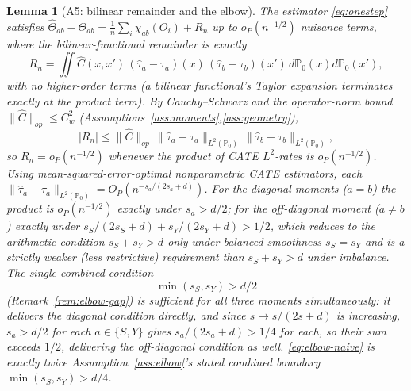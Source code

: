 \documentclass[11pt]{article}
\theoremstyle{plain}
\newtheorem{lemma}[theorem]{Lemma}
\theoremstyle{definition}
\theoremstyle{remark}
\newcommand{\PP}{\mathbb{P}}
\begin{document}
\begin{lemma}[A5: bilinear remainder and the elbow]\label{lem:elbow-remainder}
The estimator \eqref{eq:onestep} satisfies
$\hat\Theta_{ab}-\Theta_{ab}=\frac1n\sum_i\chi_{ab}(O_i)+R_n$ up to $o_P(n^{-1/2})$
nuisance terms, where the bilinear-functional remainder is exactly
\begin{equation}\label{eq:remainder}
    R_n = \iint \hat C(x,x')\,(\hat\tau_a-\tau_a)(x)\,(\hat\tau_b-\tau_b)(x')\,d\PP_0(x)d\PP_0(x'),
\end{equation}
with no higher-order terms (a bilinear functional's Taylor expansion terminates
exactly at the product term). By Cauchy--Schwarz and the operator-norm bound
$\|\hat C\|_{op}\le C_w^2$ (Assumptions~\ref{ass:moments},\ref{ass:geometry}),
\begin{equation}\label{eq:CS-remainder}
    |R_n| \le \|\hat C\|_{op}\,\|\hat\tau_a-\tau_a\|_{L^2(\PP_0)}\,\|\hat\tau_b-\tau_b\|_{L^2(\PP_0)},
\end{equation}
so $R_n=o_P(n^{-1/2})$ whenever the product of CATE $L^2$-rates is $o_P(n^{-1/2})$.
Using mean-squared-error-optimal nonparametric CATE estimators, each
$\|\hat\tau_a-\tau_a\|_{L^2(\PP_0)}=O_P(n^{-s_a/(2s_a+d)})$. For the diagonal moments
($a=b$) the product is $o_P(n^{-1/2})$ exactly under $s_a>d/2$; for the off-diagonal
moment ($a\ne b$) exactly under $s_S/(2s_S+d)+s_Y/(2s_Y+d)>1/2$, which reduces to the
arithmetic condition $s_S+s_Y>d$ only under balanced smoothness $s_S=s_Y$ and is a
strictly weaker (less restrictive) requirement than $s_S+s_Y>d$ under imbalance.
The single combined condition
\begin{equation}\label{eq:elbow-naive}
    \min(s_S,s_Y) > d/2
\end{equation}
(Remark~\ref{rem:elbow-gap}) is sufficient for all three moments simultaneously: it
delivers the diagonal condition directly, and since $s\mapsto s/(2s+d)$ is
increasing, $s_a>d/2$ for each $a\in\{S,Y\}$ gives $s_a/(2s_a+d)>1/4$ for each, so
their sum exceeds $1/2$, delivering the off-diagonal condition as well.
\eqref{eq:elbow-naive} is exactly twice Assumption~\ref{ass:elbow}'s stated combined
boundary $\min(s_S,s_Y)>d/4$.
\end{lemma}
\end{document}
